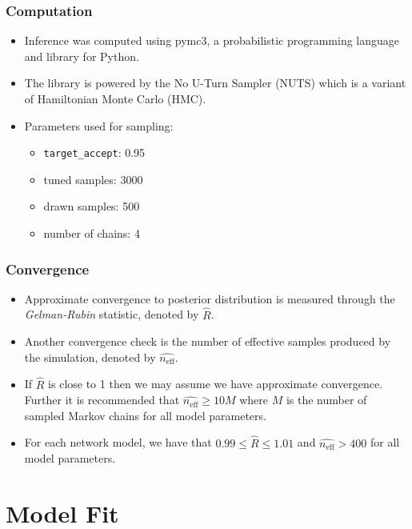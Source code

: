 \documentclass{beamer}
\begin{document}
\begin{frame}
\frametitle{Computation}
\begin{itemize}
\item Inference was computed using pymc3, a probabilistic programming language and library for Python.
\pause
\item The library is powered by the No U-Turn Sampler (NUTS) which is a variant of Hamiltonian Monte Carlo (HMC).
\pause
\item Parameters used for sampling:
  \begin{itemize}
    \item \texttt{target\_accept}: 0.95
    \item tuned samples: 3000
    \item drawn samples: 500
    \item number of chains: 4
  \end{itemize}
\end{itemize}
\end{frame}

\begin{frame}
\frametitle{Convergence}

\begin{itemize}
\item Approximate convergence to posterior distribution is measured through the \emph{Gelman-Rubin} statistic, denoted by $\hat{R}$.
\pause
\item Another convergence check is the number of effective samples produced by the simulation, denoted by $\hat{n_{\text{eff}}}$.
\pause
\item If $\hat{R}$ is close to 1 then we may assume we have approximate convergence. Further it is recommended that $\hat{n_{\text{eff}}} \geq 10 M$ where $M$ is the number of sampled Markov chains for all model parameters.
\pause
\item For each network model, we have that $0.99 \leq \hat{R} \leq 1.01$ and $\hat{n_{\text{eff}}} > 400$
    for all model parameters.

\end{itemize}
\end{frame}


\section{Model Fit}
\end{document}
